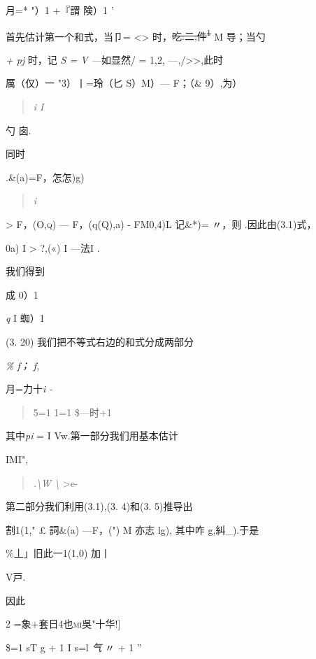 \documentclass{article}
\begin{document}
月=* "）1 +『謂 険）1 '

首先估计第一个和式，当卩= \textless{}\textgreater{}
时，\sout{吃:二;件\textsuperscript{1}} M 导；当勺

\emph{+ pj} 时，记 \emph{S = V ---}如显然/ = 1,2,
---,/\textgreater{}\textgreater{},此时

厲（仅）一 "3）丨=\textbar{}玲（匕 S）M）--- F；（\& 9）,为）\textbar{}

\begin{quote}
\emph{i I}
\end{quote}

勺 \textbar{}囱\textbar{}.

同时

.\textbar{}\&(a)\textbar{}=\textbar{}F，怎怎)g)\textbar{}

\begin{quote}
\emph{i}
\end{quote}

\textsc{\textgreater{} \textbar{}F，(O,q)\textbar{}} ---
\textbar{}F，(q(Q),a) - FM0,4)L 记\&*)= 〃，则 .因此由(3.1)式，

0a) I \textgreater{} \textbar{}?,(«) I ---法I \textbar{}.

我们得到

成 {0）1}

\emph{q} I 蜘）1

(3. 20) 我们把不等式右边的和式分成两部分

\emph{\% f； f,}

月=力十\emph{i -}

\begin{quote}
5=1 1=1 \$---时+1
\end{quote}

其中\emph{pi} = I Vw.第一部分我们用基本估计

IMI",

\begin{quote}
\emph{.\textbackslash{}W \textbackslash{}} \textgreater{}e-
\end{quote}

第二部分我们利用(3.1),(3. 4)和(3. 5)推导出

\textbar{}割1(1," £ 詞\&(a) ---F，(")\textbar{} M 亦志 lg)\textbar{},
其中咋 g,糾\_\textbar{}).于是

\%\textbar{}丄」旧此一1(1,0)\textbar{} \textbar{}加丨

V戸.

因此

2 =象+套日4也\textsc{mi}吳"十华!{]}

\$=1 sT g + 1 I s=l \emph{气} 〃 + 1 ''
\end{document}
